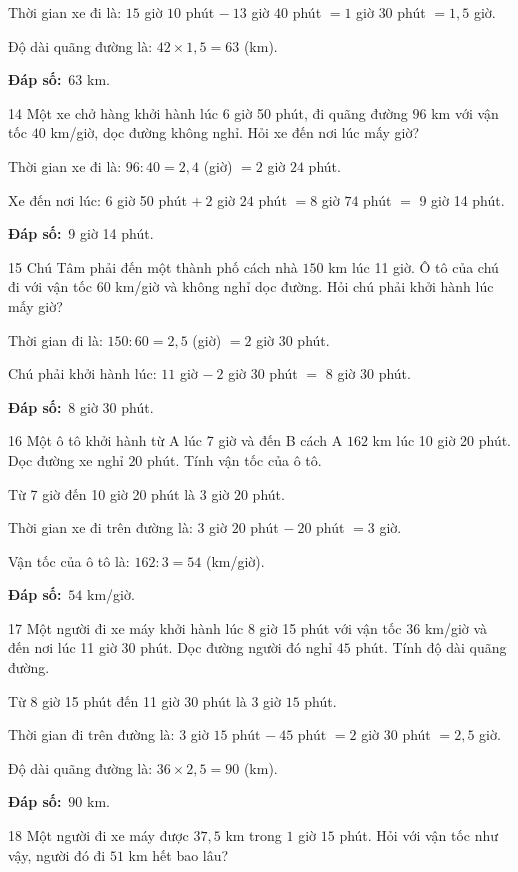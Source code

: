 \documentclass[11pt]{article}
\newif\ifsol \solfalse
\providecommand{\AnsWord}{Đáp số}
\newcommand{\dapso}[1]{\par\textbf{\AnsWord:}\ #1}
\newcommand{\probsol}[1]{%
  \begin{lrbox}{\solmeasure}\begin{minipage}{\dimexpr\linewidth-24pt\relax}#1\end{minipage}\end{lrbox}%
  \ifsol
    \begin{solbox}#1\end{solbox}%
  \else
    \setlength{\solht}{\dimexpr\ht\solmeasure+\dp\solmeasure+0.85cm\relax}%
    \ifdim\solht<1.35cm\setlength{\solht}{1.35cm}\fi
    \begin{tcolorbox}[colback=white,colframe=Line,boxrule=0.8pt,arc=5pt,
      left=8pt,right=8pt,top=4pt,bottom=4pt,height=\solht]{\footnotesize\color{Slate}\itshape\WorkWord}\end{tcolorbox}%
  \fi}
\newcommand{\gap}{\vspace{0.3cm}}
\def\WorkWord{Bài làm:}
\def\AnsWord{Đáp số}
\begin{document}
\probsol{
Thời gian xe đi là: $15$ giờ $10$ phút $-\ 13$ giờ $40$ phút $=1$ giờ $30$ phút $=1{,}5$ giờ.\par
Độ dài quãng đường là: $42\times1{,}5=63$ (km).
\dapso{$63$ km.}}
\gap
\begin{probbox}{14}{\relax}
Một xe chở hàng khởi hành lúc 6 giờ 50 phút, đi quãng đường $96$ km với vận tốc $40$ km/giờ, dọc đường không nghỉ. Hỏi xe đến nơi lúc mấy giờ?
\end{probbox}
\probsol{
Thời gian xe đi là: $96:40=2{,}4$ (giờ) $=2$ giờ $24$ phút.\par
Xe đến nơi lúc: 6 giờ 50 phút $+\ 2$ giờ $24$ phút $=8$ giờ $74$ phút $=$ 9 giờ 14 phút.
\dapso{9 giờ 14 phút.}}
\gap
\begin{probbox}{15}{\relax}
Chú Tâm phải đến một thành phố cách nhà $150$ km lúc 11 giờ. Ô tô của chú đi với vận tốc $60$ km/giờ và không nghỉ dọc đường. Hỏi chú phải khởi hành lúc mấy giờ?
\end{probbox}
\probsol{
Thời gian đi là: $150:60=2{,}5$ (giờ) $=2$ giờ $30$ phút.\par
Chú phải khởi hành lúc: $11$ giờ $-\ 2$ giờ $30$ phút $=$ 8 giờ 30 phút.
\dapso{8 giờ 30 phút.}}
\gap
\begin{probbox}{16}{\relax}
Một ô tô khởi hành từ A lúc 7 giờ và đến B cách A $162$ km lúc 10 giờ 20 phút. Dọc đường xe nghỉ $20$ phút. Tính vận tốc của ô tô.
\end{probbox}
\probsol{
Từ 7 giờ đến 10 giờ 20 phút là $3$ giờ $20$ phút.\par
Thời gian xe đi trên đường là: $3$ giờ $20$ phút $-\ 20$ phút $=3$ giờ.\par
Vận tốc của ô tô là: $162:3=54$ (km/giờ).
\dapso{$54$ km/giờ.}}
\gap
\begin{probbox}{17}{\relax}
Một người đi xe máy khởi hành lúc 8 giờ 15 phút với vận tốc $36$ km/giờ và đến nơi lúc 11 giờ 30 phút. Dọc đường người đó nghỉ $45$ phút. Tính độ dài quãng đường.
\end{probbox}
\probsol{
Từ 8 giờ 15 phút đến 11 giờ 30 phút là $3$ giờ $15$ phút.\par
Thời gian đi trên đường là: $3$ giờ $15$ phút $-\ 45$ phút $=2$ giờ $30$ phút $=2{,}5$ giờ.\par
Độ dài quãng đường là: $36\times2{,}5=90$ (km).
\dapso{$90$ km.}}
\gap
\begin{probbox}{18}{\relax}
Một người đi xe máy được $37{,}5$ km trong $1$ giờ $15$ phút. Hỏi với vận tốc như vậy, người đó đi $51$ km hết bao lâu?
\end{probbox}
\end{document}
